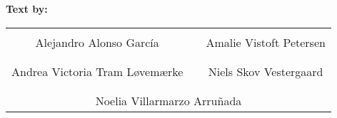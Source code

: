 \textbf{Text by:}\\
\vspace{-5pt}
\begin{table}[H]
	\centering
		\begin{tabular}{c c c}
			\underline{\phantom{JAERJAERJAERJAERGO}} & \phantom{cookies} & \underline{\phantom{JAERJAERJAERJAERGO}} \\
			Alejandro Alonso García			& \phantom{cookies} & Amalie Vistoft Petersen		\\
			&&\\
			\underline{\phantom{JAERJAERJAERJAERGO}} & \phantom{cookies} & \underline{\phantom{JAERJAERJAERJAERGO}} \\
			Andrea Victoria Tram Løvemærke			& \phantom{cookies} & Niels Skov Vestergaard		\\
			&&\\
	    \multicolumn{3}{c}{\underline{\phantom{JAERJAERJAERJAERGO}}}\\
	    \multicolumn{3}{c}{Noelia Villarmarzo Arruñada}\\				
		\end{tabular}
\end{table}

\pagebreak
\restoregeometry